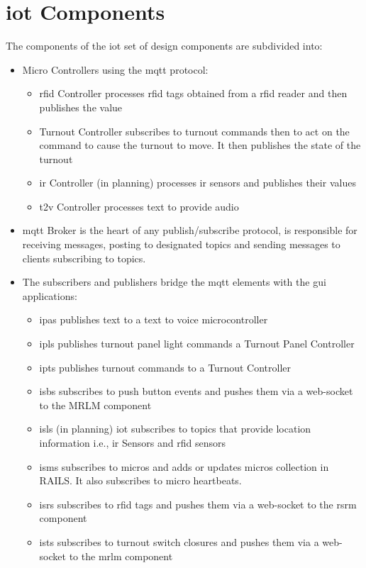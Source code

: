 \section{\gls{iot} Components}
The components of the \gls{iot} set of design components are subdivided into:
\begin{itemize}
  \item Micro Controllers using the \gls{mqtt} protocol:
\begin{itemize}
  \item \gls{rfid} Controller processes \gls{rfid} tags obtained from a \gls{rfid} reader and then publishes the value
  \item Turnout Controller subscribes to turnout commands then to act on the command to cause the turnout to move. It then publishes the state of the turnout
  \item \gls{ir} Controller (in planning) processes \gls{ir} sensors and publishes their values
  \item \gls{t2v} Controller processes text to provide audio
\end{itemize}
  \item \gls{mqtt} Broker is the heart of any publish/subscribe protocol, is responsible for receiving messages, posting to designated topics and sending messages to clients subscribing to topics.
  \item The subscribers and publishers bridge the \gls{mqtt} elements with the \gls{gui} applications:
\begin{itemize}
  \item \gls{ipas} publishes text to a text to voice microcontroller
  \item \gls{ipls} publishes turnout panel light commands a Turnout Panel Controller
  \item \gls{ipts} publishes turnout commands to a Turnout Controller
  \item \gls{isbs} subscribes to push button events and pushes them via a web-socket to the MRLM component
  \item \gls{isls} (in planning) \gls{iot} subscribes to topics that provide location information i.e., \gls{ir} Sensors and \gls{rfid} sensors
  \item \gls{isms} subscribes to micros and adds or updates micros collection in RAILS. It also subscribes to micro heartbeats.
  \item \gls{isrs} subscribes to \gls{rfid} tags and pushes them via a web-socket to the \gls{rsrm} component
  \item \gls{ists} subscribes to turnout switch closures and pushes them via a web-socket to the \gls{mrlm} component
\end{itemize}
\end{itemize}
